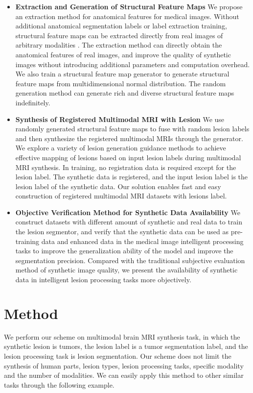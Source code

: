 \documentclass[letterpaper]{article} %
\begin{document}
\begin{itemize}
	\item \textbf{Extraction and Generation of Structural Feature Maps}
	We propose an extraction method for anatomical features for medical images. Without additional anatomical segmentation labels or label extraction training, structural feature maps can be extracted directly from real images of arbitrary modalities . The extraction method can directly obtain the anatomical features of real images, and improve the quality of synthetic images without introducing additional parameters and computation overhead. We also train a structural feature map generator to generate structural feature maps from multidimensional normal distribution. The random generation method can generate rich and diverse structural feature maps indefinitely.
	\item \textbf{Synthesis of Registered Multimodal MRI with Lesion}
	We use randomly generated structural feature maps to fuse with random lesion labels and then synthesize the registered multimodal MRIs through the generator. We explore a variety of lesion generation guidance methods to achieve effective mapping of lesions based on input lesion labels during multimodal MRI synthesis. In training, no registration data is required except for the lesion label. The synthetic data is registered, and the input lesion label is the lesion label of the synthetic data. Our solution enables fast and easy construction of registered multimodal MRI datasets with lesions label.
	\item \textbf{Objective Verification Method for Synthetic Data Availability}
	We construct datasets with different amount of synthetic and real data to train the lesion segmentor, and verify that the synthetic data can be used as pre-training data and enhanced data in the medical image intelligent processing tasks to improve the generalization ability of the model and improve the segmentation precision. Compared with the traditional subjective evaluation method of synthetic image quality, we present the availability of synthetic data in intelligent lesion processing tasks more objectively.
\end{itemize}


\section{Method}
\label{method}
We perform our scheme on multimodal brain MRI synthesis task, in which the synthetic lesion is tumors, the lesion label is a tumor segmentation label, and the lesion processing task is lesion segmentation. Our scheme does not limit the synthesis of human parts, lesion types, lesion processing tasks, specific modality and the number of modalities. We can easily apply this method to other similar tasks through the following example.
\end{document}
